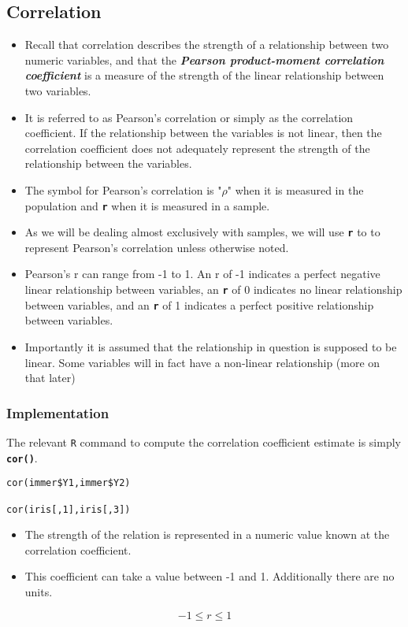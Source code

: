 
\subsection{Correlation}
\begin{itemize}
\item Recall that correlation describes the strength of a relationship between two numeric variables, and that the \textbf{\textit{Pearson product-moment correlation coefficient}} is a measure of the strength of the linear relationship between two variables.

\item It is referred to as Pearson's correlation or simply as the correlation coefficient. If the relationship between the variables is not linear, then the correlation coefficient does not adequately represent the strength of the relationship between the variables.

\item The symbol for Pearson's correlation is "$\rho$" when it is measured in the population and \texttt{\textbf{r}} when it is measured in a sample.

\item As we will be dealing almost exclusively with samples, we will use \texttt{\textbf{r}} to to represent Pearson's correlation unless otherwise noted.

\item Pearson's r can range from -1 to 1. An r of -1 indicates a perfect negative linear relationship between variables, an \texttt{\textbf{r}} of 0 indicates no linear relationship between variables, and an \texttt{\textbf{r}} of 1 indicates a perfect positive relationship between variables.

\item Importantly it is assumed that the relationship in question is supposed to be linear. Some variables will in fact have a non-linear relationship (more on that later)
\end{itemize}
\subsubsection*{Implementation}
The relevant \texttt{R} command to compute the correlation coefficient estimate is simply \texttt{\textbf{cor()}}.


\begin{framed}
\begin{verbatim}
cor(immer$Y1,immer$Y2)

cor(iris[,1],iris[,3])
\end{verbatim}
\end{framed}
\begin{itemize}
\item The strength of the relation is represented in a numeric value known at the correlation coefficient. 
\item This coefficient can take a value between -1 and 1. Additionally there are no units.
\end{itemize}
\[ -1 \leq r \leq 1\]

